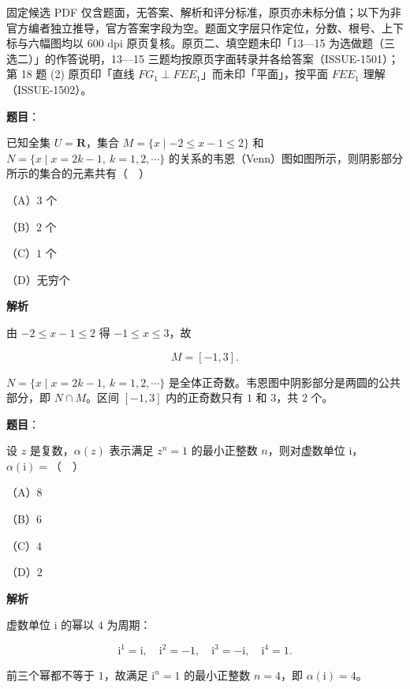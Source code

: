 

\begin{gktip}
固定候选 PDF 仅含题面，无答案、解析和评分标准，原页亦未标分值；以下为非官方编者独立推导，官方答案字段为空。题面文字层只作定位，分数、根号、上下标与六幅图均以 600 dpi 原页复核。原页二、填空题未印「13—15 为选做题（三选二）」的作答说明，13—15 三题均按原页字面转录并各给答案（ISSUE-1501）；第 18 题 (2) 原页印「直线 $FG_1\perp FEE_1$」而未印「平面」，按平面 $FEE_1$ 理解（ISSUE-1502）。
\end{gktip}

\begin{answer}

\textbf{题目}：

已知全集 $U=\mathbf R$，集合 $M=\{x\mid -2\leqslant x-1\leqslant 2\}$ 和 $N=\{x\mid x=2k-1,\ k=1,2,\cdots\}$ 的关系的韦恩（Venn）图如图所示，则阴影部分所示的集合的元素共有（　）

（A）$3$ 个

（B）$2$ 个

（C）$1$ 个

（D）无穷个
\nopagebreak[4]
\begin{center}\end{center}
\nopagebreak[4]
\textbf{解析}

由 $-2\leqslant x-1\leqslant2$ 得 $-1\leqslant x\leqslant3$，故

\nopagebreak[4]
\[M=[-1,3].\]

$N=\{x\mid x=2k-1,\ k=1,2,\cdots\}$ 是全体正奇数。韦恩图中阴影部分是两圆的公共部分，即 $N\cap M$。区间 $[-1,3]$ 内的正奇数只有 $1$ 和 $3$，共 $2$ 个。


\end{answer}
\begin{answer}

\textbf{题目}：

设 $z$ 是复数，$\alpha(z)$ 表示满足 $z^n=1$ 的最小正整数 $n$，则对虚数单位 $\mathrm i$，$\alpha(\mathrm i)=$（　）

（A）$8$

（B）$6$

（C）$4$

（D）$2$

\textbf{解析}

虚数单位 $\mathrm i$ 的幂以 $4$ 为周期：

\nopagebreak[4]
\[\mathrm i^1=\mathrm i,\quad \mathrm i^2=-1,\quad \mathrm i^3=-\mathrm i,\quad \mathrm i^4=1.\]

前三个幂都不等于 $1$，故满足 $\mathrm i^n=1$ 的最小正整数 $n=4$，即 $\alpha(\mathrm i)=4$。


\end{answer}
